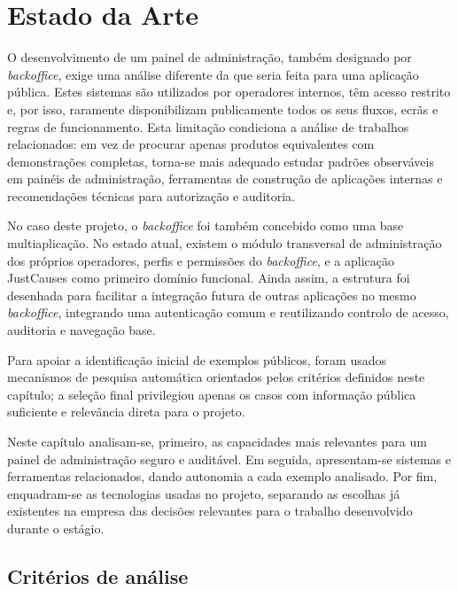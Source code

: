 \chapter{Estado da Arte}
\label{cap:estado_da_arte}

O desenvolvimento de um painel de administração, também designado por \textit{backoffice}, exige uma análise diferente da que seria feita para uma aplicação pública. Estes sistemas são utilizados por operadores internos, têm acesso restrito e, por isso, raramente disponibilizam publicamente todos os seus fluxos, ecrãs e regras de funcionamento. Esta limitação condiciona a análise de trabalhos relacionados: em vez de procurar apenas produtos equivalentes com demonstrações completas, torna-se mais adequado estudar padrões observáveis em painéis de administração, ferramentas de construção de aplicações internas e recomendações técnicas para autorização e auditoria.

No caso deste projeto, o \textit{backoffice} foi também concebido como uma base multiaplicação. No estado atual, existem o módulo transversal de administração dos próprios operadores, perfis e permissões do \textit{backoffice}, e a aplicação JustCauses como primeiro domínio funcional. Ainda assim, a estrutura foi desenhada para facilitar a integração futura de outras aplicações no mesmo \textit{backoffice}, integrando uma autenticação comum e reutilizando controlo de acesso, auditoria e navegação base.

Para apoiar a identificação inicial de exemplos públicos, foram usados mecanismos de pesquisa automática orientados pelos critérios definidos neste capítulo; a seleção final privilegiou apenas os casos com informação pública suficiente e relevância direta para o projeto.

Neste capítulo analisam-se, primeiro, as capacidades mais relevantes para um painel de administração seguro e auditável. Em seguida, apresentam-se sistemas e ferramentas relacionados, dando autonomia a cada exemplo analisado. Por fim, enquadram-se as tecnologias usadas no projeto, separando as escolhas já existentes na empresa das decisões relevantes para o trabalho desenvolvido durante o estágio.


\section{Critérios de análise}
\label{sec:criterios_analise}

